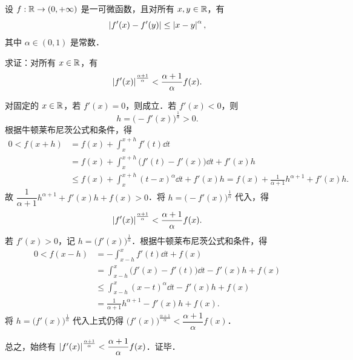 设 $f:\mathbb{R}\to(0,+\infty)$ 是一可微函数，且对所有 $x,y\in\mathbb{R}$，有
\[
  \left|f'(x)-f'(y)\right|\le \left|x-y\right|^{\alpha},
\]
其中 $\alpha\in(0,1)$ 是常数．

求证：对所有 $x\in\mathbb{R}$，有
\[
  \left|f'(x)\right|^{\frac{\alpha+1}{\alpha}}<\frac{\alpha+1}{\alpha}f(x).
\]

\begin{solution}
对固定的 $x\in\mathbb{R}$，若 $f'(x)=0$，则成立．若 $f'(x)<0$，则
\[
  h=\bigl(-f'(x)\bigr)^{\frac{1}{\alpha}}>0.
\]
根据牛顿莱布尼茨公式和条件，得
\begin{align*}
  0<f(x+h)&=f(x)+\int_{x}^{x+h}f'(t)\dd t\\
  &=f(x)+\int_{x}^{x+h}\bigl(f'(t)-f'(x)\bigr)\dd t+f'(x)h\\
  &\le f(x)+\int_{x}^{x+h}(t-x)^{\alpha}\dd t+f'(x)h
  =f(x)+\frac{1}{\alpha+1}h^{\alpha+1}+f'(x)h.
\end{align*}
故 $\dfrac{1}{\alpha+1}h^{\alpha+1}+f'(x)h+f(x)>0$．将 $h=\bigl(-f'(x)\bigr)^{\frac{1}{\alpha}}$ 代入，得
\[
  \left|f'(x)\right|^{\frac{\alpha+1}{\alpha}}<\frac{\alpha+1}{\alpha}f(x).
\]
若 $f'(x)>0$，记 $h=\bigl(f'(x)\bigr)^{\frac{1}{\alpha}}$．根据牛顿莱布尼茨公式和条件，得
\begin{align*}
  0<f(x-h)&=-\int_{x-h}^{x}f'(t)\dd t+f(x)\\
  &=\int_{x-h}^{x}\bigl(f'(x)-f'(t)\bigr)\dd t-f'(x)h+f(x)\\
  &\le \int_{x-h}^{x}(x-t)^{\alpha}\dd t-f'(x)h+f(x)\\
  &=\frac{1}{\alpha+1}h^{\alpha+1}-f'(x)h+f(x).
\end{align*}
将 $h=\bigl(f'(x)\bigr)^{\frac{1}{\alpha}}$ 代入上式仍得 $\bigl(f'(x)\bigr)^{\frac{\alpha+1}{\alpha}}<\dfrac{\alpha+1}{\alpha}f(x)$．

总之，始终有 $\left|f'(x)\right|^{\frac{\alpha+1}{\alpha}}<\dfrac{\alpha+1}{\alpha}f(x)$．证毕．
\end{solution}
